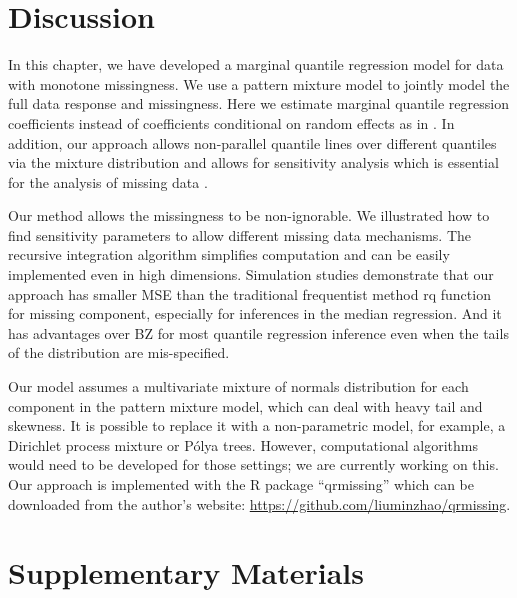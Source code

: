 \documentclass[useAMS,usenatbib,referee]{biom}
\newcommand{\polya}{P\'{o}lya} \newcommand{\yobs}{\bmath y_{\itl{obs}}}
\begin{document}

\section{Discussion}
\label{ch3:sec:discussion}

In this chapter, we have developed a marginal quantile regression model
for data with monotone missingness. We use a pattern mixture model to
jointly model the full data response and missingness. Here we estimate
marginal quantile regression coefficients instead of coefficients
conditional on random effects as in \citet{yuan2010}. In addition, our
approach allows non-parallel quantile lines over different quantiles
via the mixture distribution and allows for sensitivity analysis which
is essential for the analysis of missing data \citep{nas2010}.

Our method allows the missingness to be non-ignorable.
We illustrated how to find sensitivity parameters to allow different missing data mechanisms.
The recursive integration algorithm simplifies computation and can be easily implemented even in high dimensions.
Simulation studies demonstrate that our approach has smaller MSE than the traditional frequentist method rq function for missing component, especially for inferences in the median regression.
And it has advantages over BZ for most quantile regression inference even when the tails of the distribution are mis-specified.

Our model assumes a multivariate mixture of normals distribution for each component in the pattern mixture model, which can deal with heavy tail and skewness.
It is possible to replace it with a non-parametric model, for example, a Dirichlet process mixture or \polya{} trees.
However, computational algorithms would need to be developed for those settings;  we are currently working on this.
Our approach is implemented with the R package ``qrmissing'' which can be downloaded from the author's website: \url{https://github.com/liuminzhao/qrmissing}.

\backmatter

\section*{Supplementary Materials}
\end{document}
